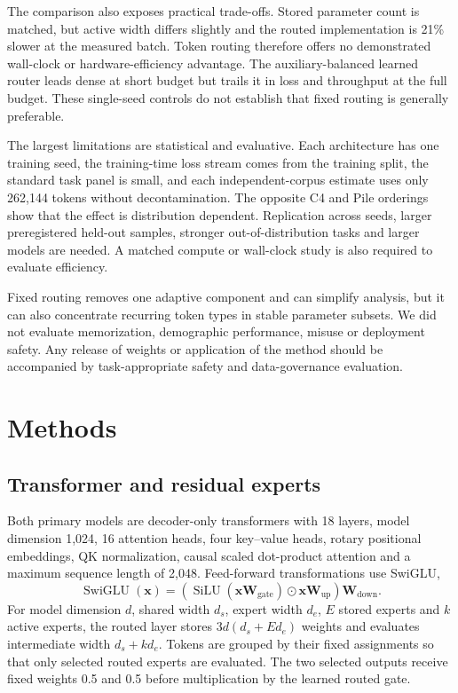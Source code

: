 \documentclass[11pt]{article}
\begin{document}
The comparison also exposes practical trade-offs. Stored parameter count is matched, but active width differs slightly and the routed implementation is 21\% slower at the measured batch. Token routing therefore offers no demonstrated wall-clock or hardware-efficiency advantage. The auxiliary-balanced learned router leads dense at short budget but trails it in loss and throughput at the full budget. These single-seed controls do not establish that fixed routing is generally preferable.

The largest limitations are statistical and evaluative. Each architecture has one training seed, the training-time loss stream comes from the training split, the standard task panel is small, and each independent-corpus estimate uses only 262,144 tokens without decontamination. The opposite C4 and Pile orderings show that the effect is distribution dependent. Replication across seeds, larger preregistered held-out samples, stronger out-of-distribution tasks and larger models are needed. A matched compute or wall-clock study is also required to evaluate efficiency.

Fixed routing removes one adaptive component and can simplify analysis, but it can also concentrate recurring token types in stable parameter subsets. We did not evaluate memorization, demographic performance, misuse or deployment safety. Any release of weights or application of the method should be accompanied by task-appropriate safety and data-governance evaluation.

\section*{Methods}

\subsection*{Transformer and residual experts}

Both primary models are decoder-only transformers with 18 layers, model dimension 1,024, 16 attention heads, four key--value heads, rotary positional embeddings, QK normalization, causal scaled dot-product attention and a maximum sequence length of 2,048. Feed-forward transformations use SwiGLU,
\begin{equation}
\operatorname{SwiGLU}(\mathbf{x})=
(\operatorname{SiLU}(\mathbf{x}\mathbf{W}_{\mathrm{gate}})\odot
\mathbf{x}\mathbf{W}_{\mathrm{up}})\mathbf{W}_{\mathrm{down}}.
\end{equation}
For model dimension $d$, shared width $d_s$, expert width $d_e$, $E$ stored experts and $k$ active experts, the routed layer stores $3d(d_s+Ed_e)$ weights and evaluates intermediate width $d_s+kd_e$. Tokens are grouped by their fixed assignments so that only selected routed experts are evaluated. The two selected outputs receive fixed weights 0.5 and 0.5 before multiplication by the learned routed gate.
\end{document}
